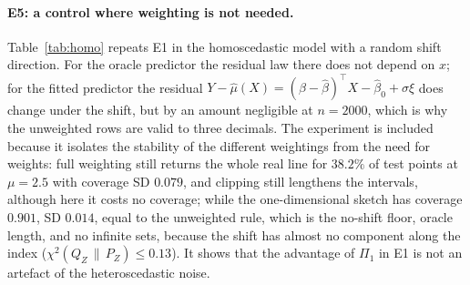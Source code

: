 \documentclass[11pt,a4paper]{article}
\newcommand{\chisqZ}{\chi^2(Q_Z\,\|\,P_Z)}
\theoremstyle{plain}
\theoremstyle{definition}
\theoremstyle{remark}
\begin{document}
\FloatBarrier
\paragraph{E5: a control where weighting is not needed.}
Table~\ref{tab:homo} repeats E1 in the homoscedastic model with a random shift direction. For the oracle predictor the residual law there does not depend on $x$; for the fitted predictor the residual $Y-\hat\mu(X)=(\beta-\hat\beta)^{\!\top}X-\hat\beta_0+\sigma\xi$ does change under the shift, but by an amount negligible at $n=2000$, which is why the unweighted rows are valid to three decimals. The experiment is included because it isolates the stability of the different weightings from the need for weights: full weighting still returns the whole real line for $38.2\%$ of test points at $\mu=2.5$ with coverage SD $0.079$, and clipping still lengthens the intervals, although here it costs no coverage; while the one-dimensional sketch has coverage $0.901$, SD $0.014$, equal to the unweighted rule, which is the no-shift floor, oracle length, and no infinite sets, because the shift has almost no component along the index ($\chisqZ\le0.13$). It shows that the advantage of $\Pi_1$ in E1 is not an artefact of the heteroscedastic noise.
\end{document}
